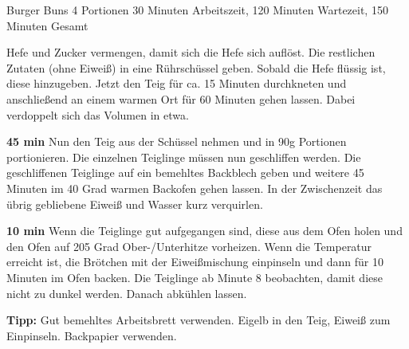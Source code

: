 \begin{recipe}{Burger Buns} {4 Portionen} {30 Minuten Arbeitszeit, 120 Minuten Wartezeit, 150 Minuten Gesamt}

  \freeform{}\textit{}


  Hefe und Zucker vermengen, damit sich die Hefe sich auflöst.
  Die restlichen Zutaten (ohne Eiweiß) in eine Rührschüssel geben.
  Sobald die Hefe flüssig ist, diese hinzugeben.
  Jetzt den Teig für ca. 15 Minuten durchkneten und anschließend an einem warmen Ort für 60 Minuten gehen lassen.
  Dabei verdoppelt sich das Volumen in etwa.

  \newstep{}\textbf{45 min}
  Nun den Teig aus der Schüssel nehmen und in 90g Portionen portionieren.
  Die einzelnen Teiglinge müssen nun geschliffen werden.
  Die geschliffenen Teiglinge auf ein bemehltes Backblech geben und weitere 45 Minuten im 40 Grad warmen Backofen gehen lassen.
  In der Zwischenzeit das übrig gebliebene Eiweiß und Wasser kurz verquirlen.

  \newstep{}\textbf{10 min}
  Wenn die Teiglinge gut aufgegangen sind, diese aus dem Ofen holen und den Ofen auf 205 Grad Ober-/Unterhitze vorheizen.
  Wenn die Temperatur erreicht ist, die Brötchen mit der Eiweißmischung einpinseln und dann für 10 Minuten im Ofen backen.
  Die Teiglinge ab Minute 8 beobachten, damit diese nicht zu dunkel werden.
  Danach abkühlen lassen.

  \freeform{}\hrulefill{}

  \freeform{}\textbf{Tipp:}
  Gut bemehltes Arbeitsbrett verwenden.
  Eigelb in den Teig, Eiweiß zum Einpinseln.
  Backpapier verwenden.

\end{recipe}
